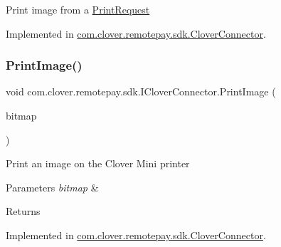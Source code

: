 Print image from a \hyperlink{classcom_1_1clover_1_1remotepay_1_1sdk_1_1_print_request}{Print\+Request} 



Implemented in \hyperlink{classcom_1_1clover_1_1remotepay_1_1sdk_1_1_clover_connector_aefaa2e93fe6c7b01f6b271a42e684132}{com.\+clover.\+remotepay.\+sdk.\+Clover\+Connector}.

\mbox{\label{interfacecom_1_1clover_1_1remotepay_1_1sdk_1_1_i_clover_connector_ac716d55882598b92984159f4898bbe2a}} 
\subsubsection{\texorpdfstring{Print\+Image()}{PrintImage()}}
{\footnotesize\ttfamily void com.\+clover.\+remotepay.\+sdk.\+I\+Clover\+Connector.\+Print\+Image (\begin{DoxyParamCaption}\item[{Bitmap}]{bitmap }\end{DoxyParamCaption})}



Print an image on the Clover Mini printer 


\begin{DoxyParams}{Parameters}
{\em bitmap} & \\
\hline
\end{DoxyParams}
\begin{DoxyReturn}{Returns}

\end{DoxyReturn}


Implemented in \hyperlink{classcom_1_1clover_1_1remotepay_1_1sdk_1_1_clover_connector_a4743d4155d22ddc978602814cb72ee6b}{com.\+clover.\+remotepay.\+sdk.\+Clover\+Connector}.

\mbox{\label{interfacecom_1_1clover_1_1remotepay_1_1sdk_1_1_i_clover_connector_a16ffe34012c788351332d1d2c41be602}} 
